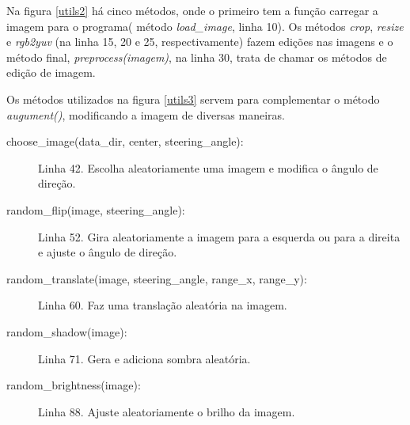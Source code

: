 Na figura \ref{utils2} há cinco métodos, onde o primeiro tem a função carregar a imagem para o programa( método \textit{load\_image}, linha 10). Os métodos \textit{crop}, \textit{resize} e \textit{rgb2yuv} (na linha 15, 20 e 25, respectivamente) fazem edições nas imagens e o método final, \textit{preprocess(imagem)}, na linha 30, trata de chamar os métodos de edição de imagem.

\begin{figure}[H]
	\centering
\end{figure}

Os métodos utilizados na figura \ref{utils3} servem para complementar o método \textit{augument()}, modificando a imagem de diversas maneiras.
\begin{description}
    \item[choose\_image(data\_dir, center, steering\_angle):] Linha 42. Escolha aleatoriamente uma imagem e modifica o ângulo de direção.
    \item[random\_flip(image, steering\_angle):] Linha 52. Gira aleatoriamente a imagem para a esquerda ou para a direita e ajuste o ângulo de direção.
    \item[random\_translate(image, steering\_angle, range\_x, range\_y):] Linha 60. Faz uma translação aleatória na imagem.
    \item[random\_shadow(image):] Linha 71. Gera e adiciona sombra aleatória.
    \item[random\_brightness(image):] Linha 88. Ajuste aleatoriamente o brilho da imagem.
\end{description}

